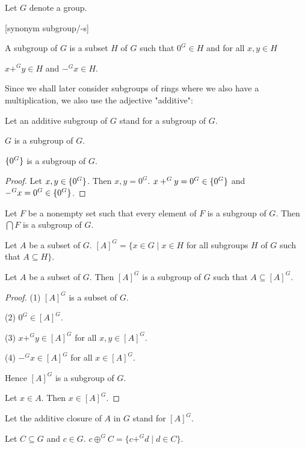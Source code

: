 \documentclass[11pt]{article}
\begin{document}
\begin{forthel}

Let $G$ denote a group. 

[synonym subgroup/-s]

\begin{definition} A subgroup of $G$ is a subset $H$ of $G$ such that
$0^{G} \in H$ and for all $x,y \in H$ 

$x +^{G} y \in H$ and $-^{G} x \in H$.
\end{definition}

\end{forthel}
Since we shall later consider subgroups of rings where we also have a multiplication,
we also use the adjective "additive":
\begin{forthel}

Let an additive subgroup of $G$ stand for a subgroup of $G$.

\begin{lemma} $G$ is a subgroup of $G$. \end{lemma}

\begin{lemma} $\{0^{G}\}$ is a subgroup of $G$.
\end{lemma}

\begin{proof}
Let $x,y \in \{0^{G}\}$. Then $x,y = 0^{G}$.
$x +^{G} y = 0^{G} \in \{0^{G}\}$ and $-^{G} x = 0^{G} \in \{0^{G}\}$.
\end{proof}

\begin{lemma} Let $F$ be a nonempty set such that every element of $F$ is a subgroup of $G$.
Then $\bigcap F$ is a subgroup of $G$.
\end{lemma}

\begin{definition}
Let $A$ be a subset of $G$.
$[A]^{G} = \{x \in G \mid x \in H$ for all subgroups $H$ of $G$ 
such that $A \subseteq H\}$.
\end{definition}

\begin{lemma}
Let $A$ be a subset of $G$. Then $[A]^{G}$ is a subgroup of $G$ such
that $A \subseteq [A]^{G}$.
\end{lemma}
\begin{proof}

(1) $[A]^{G}$ is a subset of $G$.

(2) $0^{G} \in [A]^{G}$.

(3) $x +^{G} y \in [A]^{G}$ for all $x,y \in [A]^{G}$.

(4) $-^{G} x \in [A]^{G}$ for all $x \in [A]^{G}$.

Hence $[A]^{G}$ is a subgroup of $G$.

Let $x \in A$. 
Then $x \in [A]^{G}$.
\end{proof}

Let the additive closure of $A$ in $G$ stand for $[A]^{G}$.

\begin{definition}
Let $C \subseteq G$ and $c \in G$.
$c \oplus^{G} C = \{c +^{G} d \mid d \in C\}$.
\end{definition}
\end{forthel}
\end{document}
